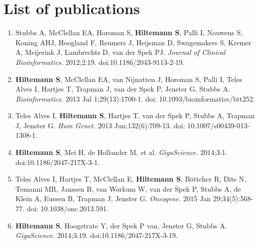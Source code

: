 \chapter{List of publications}
\label{AppendixD}

\begin{enumerate}
\item Stubbs A, McClellan EA, Horsman S, \textbf{Hiltemann S}, Palli I, Nouwens S, Koning AHJ, Hoogland F, Reumers J, Heijsman D, Swagemakers S, Kremer A, Meijerink J, Lambrechts D, van der Spek PJ. {\color{chaptergrey}{Huvariome: a web server resource of whole genome next-generation sequencing allelic frequencies to aid in pathological candidate gene selection.}} \textit{Journal of Clinical Bioinformatics.} 2012;2:19. doi:10.1186/2043-9113-2-19.

\item \textbf{Hiltemann S}, McClellan EA, van Nijnatten J, Horsman S, Palli I, Teles Alves I, Hartjes T, Trapman J, van der Spek P, Jenster G, Stubbs A. {\color{chaptergrey}{iFUSE: integrated fusion gene explorer.}} \textit{Bioinformatics.} 2013 Jul 1;29(13):1700-1. doi: 10.1093/bioinformatics/btt252.

\item Teles Alves I, \textbf{Hiltemann S}, Hartjes T, van der Spek P, Stubbs A, Trapman J, Jenster G. {\color{chaptergrey}{Gene fusions by chromothripsis of chromosome 5q in the VCaP prostate cancer cell line.}} \textit{Hum Genet.} 2013 Jun;132(6):709-13. doi: 10.1007/s00439-013-1308-1.

\item \textbf{Hiltemann S}, Mei H, de Hollander M, et al. {\color{chaptergrey}{CGtag: complete genomics toolkit and annotation in a cloud-based Galaxy.}} \textit{GigaScience.} 2014;3:1. doi:10.1186/2047-217X-3-1.

\item Teles Alves I, Hartjes T, McClellan E, \textbf{Hiltemann S}, Böttcher R, Dits N, Temanni MR, Janssen B, van Workum W, van der Spek P, Stubbs A, de Klein A, Eussen B, Trapman J, Jenster G. {\color{chaptergrey}{Next-generation sequencing reveals novel rare fusion events with functional implication in prostate cancer.}} \textit{Oncogene.} 2015 Jan 29;34(5):568-77. doi: 10.1038/onc.2013.591.

\item \textbf{Hiltemann S}, Hoogstrate Y, der Spek P van, Jenster G, Stubbs A. {\color{chaptergrey}{iReport: a generalised Galaxy solution for integrated experimental reporting.}} \textit{GigaScience.} 2014;3:19. doi:10.1186/2047-217X-3-19.


\end{enumerate}
